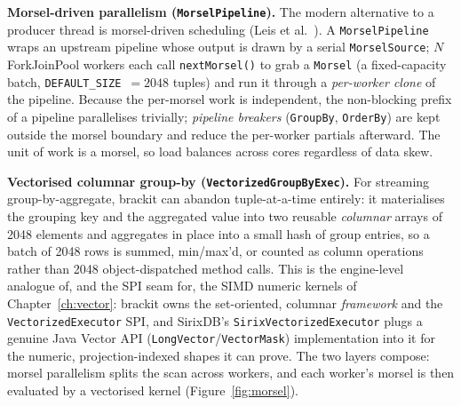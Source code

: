 \documentclass[11pt,a4paper,oneside]{report}
\theoremstyle{sirixthm}
\newcommand{\code}[1]{\texttt{#1}}
\begin{document}
\textbf{Morsel-driven parallelism (\code{MorselPipeline}).} The modern alternative to a producer thread is
morsel-driven scheduling (Leis et al.~\cite{morsel}). A \code{MorselPipeline} wraps an upstream pipeline whose output is
drawn by a serial \code{MorselSource}; $N$ ForkJoinPool workers each call \code{nextMorsel()} to grab a
\code{Morsel} (a fixed-capacity batch, \code{DEFAULT\_SIZE}~$=2048$ tuples) and run it through a
\emph{per-worker clone} of the pipeline. Because the per-morsel work is independent, the non-blocking
prefix of a pipeline parallelises trivially; \emph{pipeline breakers} (\code{GroupBy}, \code{OrderBy})
are kept outside the morsel boundary and reduce the per-worker partials afterward. The unit of work is a
morsel, so load balances across cores regardless of data skew.

\textbf{Vectorised columnar group-by (\code{VectorizedGroupByExec}).} For streaming group-by-aggregate,
brackit can abandon tuple-at-a-time entirely: it materialises the grouping key and the aggregated value
into two reusable \emph{columnar} arrays of 2048 elements and aggregates in place into a small hash of
group entries, so a batch of 2048 rows is summed, min/max'd, or counted as column operations rather than
2048 object-dispatched method calls. This is the engine-level analogue of, and the SPI seam for, the
SIMD numeric kernels of Chapter~\ref{ch:vector}: brackit owns the set-oriented, columnar \emph{framework}
and the \code{VectorizedExecutor} SPI, and SirixDB's \code{SirixVectorizedExecutor} plugs a genuine Java
Vector API (\code{LongVector}/\allowbreak\code{VectorMask}) implementation into it for the numeric, projection-indexed
shapes it can prove. The two layers compose: morsel parallelism splits the scan across workers, and each
worker's morsel is then evaluated by a vectorised kernel (Figure~\ref{fig:morsel}).
\end{document}
